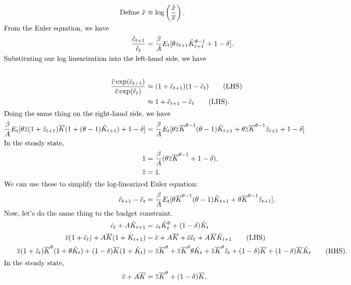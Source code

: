 \documentclass[11pt]{article}
\begin{document}
\begin{enumerate}
\begin{align*}
\text{Define } \tilde{x} &\equiv \log\left(\frac{\hat{x}}{\overline{x}}\right).\\
\intertext{From the Euler equation, we have}
\frac{\hat{c}_{t + 1}}{\hat{c}_t} &= \frac{\beta}{A} E_t [\theta z_{t + 1}\hat{K}^{\theta - 1}_{t + 1} + 1 - \delta].\\
\intertext{Substituting our log linearization into the left-hand side, we have}\\
\frac{\overline{c}\exp(\tilde{c}_{t + 1})}{\overline{c} \exp (\tilde{c}_t)} &\approx (1 + \tilde{c}_{t + 1})(1 - \tilde{c}_t)\tag{LHS}\\
&\approx 1 + \tilde{c}_{t + 1} - \tilde{c}_t \tag{LHS}.\\
\intertext{Doing the same thing on the right-hand side, we have}
\frac{\beta}{A} E_t [\theta \overline{z} (1 + \tilde{z}_{t + 1})\overline{K}(1 + (\theta - 1)\hat{K}_{t + 1}) + 1 - \delta] &=
\frac{\beta}{A} E_t [\theta \overline{z} \overline{K}^{\theta - 1}(\theta - 1)\tilde{K}_{t + 1} + \theta \overline{z} \overline{K}^{\theta - 1}\tilde{z}_{t + 1} + 1 - \delta]\\
\intertext{In the steady state,}
1 &= \frac{\beta}{A}(\theta \overline{z} \overline{K}^{\theta - 1} + 1 - \delta),\\
\overline{z} &= 1.\\
\intertext{We can use these to simplify the log-linearized Euler equation:} 
\tilde{c}_{t + 1} - \tilde{c}_t &= \frac{\beta}{A} E_t [\theta \overline{K}^{\theta - 1}(\theta - 1)\tilde{K}_{t + 1} + \theta \overline{K}^{\theta - 1} \tilde{z}_{t + 1}].\\
\intertext{Now, let's do the same thing to the budget constraint.}
\hat{c}_t + A\hat{K}_{t + 1} &= z_t \hat{K}_t^\theta + (1 - \delta)\hat{K}_t \\
\overline{c}(1 + \tilde{c}_t) + A \overline{K} (1 + \hat{K}_{t + 1}) &= \overline{c} + A\overline{K} + \overline{c}\tilde{c}_t + A\overline{K}\tilde{K}_{t + 1}\tag{LHS}\\
\overline{z}(1 + \tilde{z}_t)\overline{K}^\theta (1 + \theta \tilde{K}_t) + (1 - \delta)\overline{K}(1 + \tilde{K}_t) &=
\overline{z} \overline{K}^\theta + \overline{z} \overline{K}^\theta \theta \tilde{K}_t + \overline{z} \overline{K}^\theta \tilde{z}_t + (1 - \delta) \overline{K} + (1 - \delta)\overline{K} \tilde{K}_t \tag{RHS}.\\
\intertext{In the steady state,}
\overline{c} + A \overline{K} &= \overline{z}\overline{K}^\theta + (1 - \delta)\overline{K},\\

\end{align*}
\end{enumerate}
\end{document}
